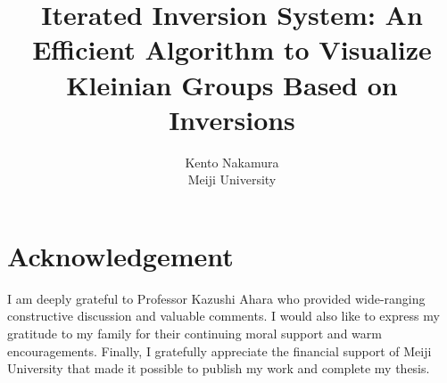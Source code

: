 \documentclass[uplatex, dvipdfmx]{article}
\title{ Iterated Inversion System: An Efficient Algorithm to Visualize Kleinian Groups Based on Inversions }
\author{ Kento Nakamura\\
Meiji University\\
}
\date{}
\begin{document}
\pagestyle{plain}
















\section*{Acknowledgement}

I am deeply grateful to Professor Kazushi Ahara who provided
wide-ranging constructive discussion and valuable comments.
I would also like to express my gratitude to my family for their
continuing moral support and warm encouragements.
Finally, I gratefully appreciate the financial support of Meiji
University that made it possible to publish my work and  complete my
thesis.

\printbibliography
\end{document}
